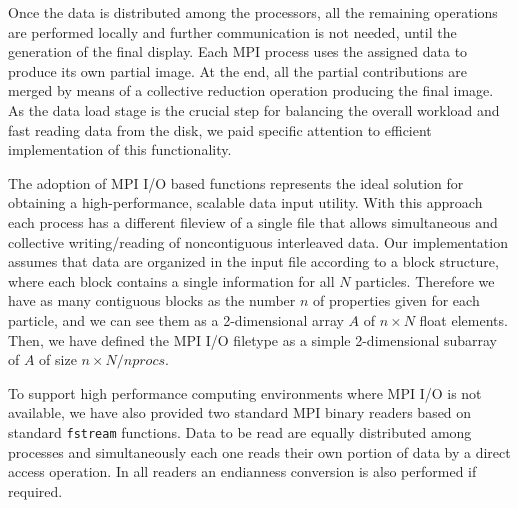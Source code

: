 \documentclass[1p,times]{elsarticle}
\begin{document}
Once the data is distributed among the processors, all the remaining operations 
are performed locally and further communication is not needed, until the generation
of the final display. Each MPI process uses the assigned 
data to produce its own partial image. At the end, all the partial contributions are merged by means of a
collective reduction operation producing the final image. As the data load stage is the crucial step for balancing the overall workload and fast reading
data from the disk, we paid specific attention to efficient implementation of this functionality.

The adoption of MPI I/O based functions represents the ideal solution for obtaining
a high-performance, scalable data input utility.
With this approach each process has a different fileview of a single file 
that allows simultaneous and collective
writing/reading of noncontiguous interleaved data. 
Our implementation assumes that data are organized in the input file according to a block structure, 
where each block contains a single information for 
all $N$ particles. Therefore we have as many contiguous blocks
as the number $n$ of properties given for each particle, and we can see them as a 2-dimensional array $A$ 
of $n \times N$ float elements. 
Then, we have defined the MPI I/O filetype as a simple 2-dimensional subarray of $A$ 
of size $n \times N/nprocs$.

To support high performance computing environments where MPI I/O is not available, 
we have also provided two standard MPI binary readers based on standard {\tt fstream} functions.
Data to be read are equally distributed among processes and simultaneously each one reads
their own portion of data by a direct access operation. 
%
In all readers an endianness conversion is also performed if required.
\end{document}
